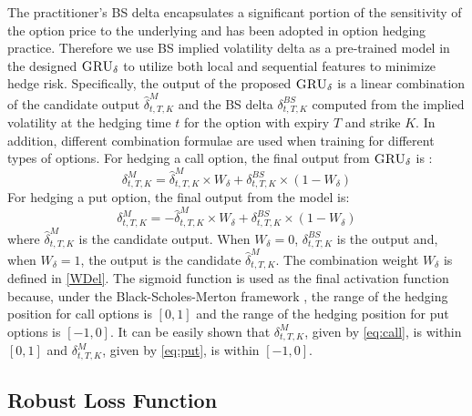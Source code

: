 \documentclass[letterpaper,12pt,titlepage,oneside,final]{book}
\numberwithin{equation}{section}
\theoremstyle{definition}
\newcommand{\model}{\textsc{GRU}_\delta}
\begin{document}
The practitioner's BS delta encapsulates a significant portion of the sensitivity of the option price to the underlying and has been adopted in option hedging practice. Therefore we use BS implied volatility delta as a pre-trained model in the designed $\model$ to utilize both local and sequential features to minimize hedge risk.
Specifically, the output of the proposed  $\model$ is a linear combination of the candidate output $\widehat{\delta}^M_{t,T,K}$ and the BS delta $\delta^{BS}_{t,T,K}$ computed from the implied volatility at the hedging time $t$ for the option with expiry $T$ and strike $K$. In addition,  different combination formulae are used when training for different types of options.
For hedging a call option, the final output from $\model$ is :
\begin{equation}
\delta^M_{t,T,K}=\widehat{\delta}^M_{t,T,K} \times W_{\delta} +\delta^{BS}_{t,T,K} \times (1-W_{\delta})
\label{eq:call}
\end{equation}
For hedging a put option, the final output from the model is:
\begin{equation}
\delta^M_{t,T,K}=-\widehat{\delta}^M_{t,T,K} \times W_{\delta} +\delta^{BS}_{t,T,K} \times (1-W_{\delta})
\label{eq:put}
\end{equation}
where $\widehat{\delta}^M_{t,T,K}$ is the candidate output.
When $W_{\delta}=0$,  $\delta^{BS}_{t,T,K}$  is the output and, when $W_{\delta}=1$,  the output  is the candidate $\widehat{\delta}^M_{t,T,K}$. The combination weight $W_{\delta}$
is defined in \eqref{WDel}.
  The sigmoid function is used as the final activation function because, under the Black-Scholes-Merton framework \citep{black1973pricing}, the range of the hedging position for call options is $[0,1]$ and  the range of the hedging position for put options is $[-1,0]$. It can be easily shown that $\delta^M_{t,T,K}$, given by \eqref{eq:call}, is within $[0,1]$ and  $\delta^M_{t,T,K}$, given by \eqref{eq:put}, is within $[-1,0]$.

\subsection{Robust Loss Function}
\end{document}
